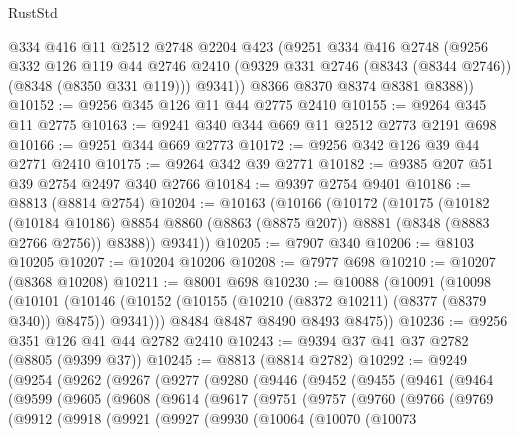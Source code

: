 \begin{lexlean}{RustStd}
\begin{coremodule}
{\begin{coremodule}
{{{{{{{{{{{{{{{{{{{{{{{{{{{{{{{{{{{{{{{{{{{{{{{{{{        @334
        @416
        @11
        @2512
        @2748
        @2204
        @423
        (@9251
          @334
          @416
          @2748
          (@9256
            @332
            @126
            @119
            @44
            @2746
            @2410
            (@9329 @331 @2746 (@8343 (@8344 @2746)) (@8348 (@8350 @331 @119)))
            @9341))
        @8366
        @8370
        @8374
        @8381
        @8388))
@10152 := @9256 @345 @126 @11 @44 @2775 @2410
@10155 := @9264 @345 @11 @2775
@10163 := @9241 @340 @344 @669 @11 @2512 @2773 @2191 @698
@10166 := @9251 @344 @669 @2773
@10172 := @9256 @342 @126 @39 @44 @2771 @2410
@10175 := @9264 @342 @39 @2771
@10182 := @9385 @207 @51 @39 @2754 @2497 @340 @2766
@10184 := @9397 @2754 @9401
@10186 := @8813 (@8814 @2754)
@10204 := @10163
    (@10166
      (@10172
        (@10175
          (@10182
            (@10184 @10186)
            @8854
            @8860
            (@8863 (@8875 @207))
            @8881
            (@8348 (@8883 @2766 @2756))
            @8388))
        @9341))
@10205 := @7907 @340
@10206 := @8103 @10205
@10207 := @10204 @10206
@10208 := @7977 @698
@10210 := @10207 (@8368 @10208)
@10211 := @8001 @698
@10230 := @10088
    (@10091
      (@10098
        (@10101 (@10146 (@10152 (@10155 (@10210 (@8372 @10211) (@8377 (@8379 @340)) @8475)) @9341)))
        @8484
        @8487
        @8490
        @8493
        @8475))
@10236 := @9256 @351 @126 @41 @44 @2782 @2410
@10243 := @9394 @37 @41 @37 @2782 (@8805 (@9399 @37))
@10245 := @8813 (@8814 @2782)
@10292 := @9249
    (@9254
      (@9262
        (@9267
          (@9277
            (@9280
              (@9446
                (@9452
                  (@9455
                    (@9461
                      (@9464
                        (@9599
                          (@9605
                            (@9608
                              (@9614
                                (@9617
                                  (@9751
                                    (@9757
                                      (@9760
                                        (@9766
                                          (@9769
                                            (@9912
                                              (@9918
                                                (@9921
                                                  (@9927
                                                    (@9930
                                                      (@10064
                                                        (@10070
                                                          (@10073
}}}}}}}}}}}}}}}}}}}}}}}}}}}}}}}}}}}}}}}}}}}}}}}}}}
\end{coremodule}}
\end{coremodule}
\end{lexlean}
